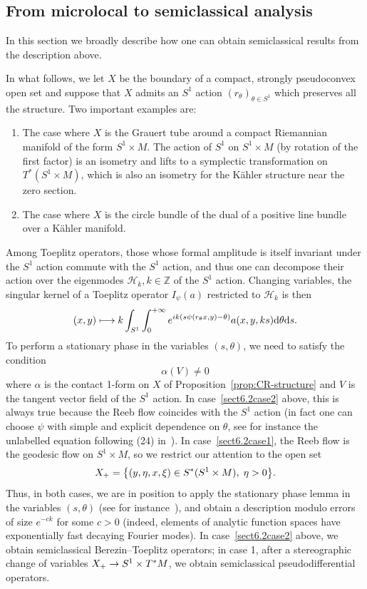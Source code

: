 \documentclass[AHL,Unicode,longabstracts,published]{cedram}
\newcommand{\clH}{\mathcal{H}}
\newcommand\1{\mathds{1}}
\newcommand{\Z}{\mathbb{Z}}
\newcommand{\dd}{\mathrm{d}}
\renewcommand*{\to}{\mathchoice{\longrightarrow}{\rightarrow}{\rightarrow}{\rightarrow}}
\let\oldmapsto\mapsto
\renewcommand*{\mapsto}{\mathchoice{\longmapsto}{\oldmapsto}{\oldmapsto}{\oldmapsto}}
\let\originalleft\left
\let\originalright\right
\renewcommand{\left}{\mathopen{}\mathclose\bgroup\originalleft}
\renewcommand{\right}{\aftergroup\egroup\originalright}
\begin{document}
\subsection{From microlocal to semiclassical analysis}\label{sec:from-micr-semicl}
In this section we broadly describe how one can obtain semiclassical results from the description above.

In what follows, we let $X$ be the boundary of a compact, strongly pseudoconvex open set and suppose that $X$ admits an $S^1$ action $(r_{\theta})_{\theta\in S^1}$ which preserves all the structure. Two important examples are:
\begin{enumerate}
\item\label{sect6.2case1} The case where $X$ is the Grauert tube around a compact Riemannian manifold of the form $S^1\times M$. The action of $S^1$ on $S^1\times M$ (by rotation of the first factor) is an isometry and lifts to a symplectic transformation on $T^*(S^1\times M)$, which is also an isometry for the K\"ahler structure near the zero section.
\item\label{sect6.2case2} The case where $X$ is the circle bundle of the dual of a positive line bundle over a K\"ahler manifold.
\end{enumerate}

Among Toeplitz operators, those whose formal amplitude is itself invariant under the $S^1$ action commute with the $S^1$ action, and thus one can decompose their action over the eigenmodes $\clH_k,k\in \Z$ of the $S^1$ action. Changing variables, the singular kernel of a Toeplitz operator $I_{\psi}(a)$ restricted to $\clH_k$ is then
\[
(x,y)\mapsto k\int_{S^1}\int_{0}^{+\infty}e^{ik(s\psi(r_{\theta}x,y)-\theta)}a(x,y,ks)\dd
\theta \dd s.
\]
To perform a stationary phase in the variables $(s,\theta)$, we need to satisfy the condition
\[
\alpha(V)\neq 0
\]
where $\alpha$ is the contact 1-form on $X$ of Proposition~\ref{prop:CR-structure} and $V$ is the tangent vector field of the $S^1$ action. In case~\eqref{sect6.2case2} above, this is always true because the Reeb flow coincides with the $S^1$ action (in fact one can choose $\psi$ with simple and explicit dependence on $\theta$, see for instance the unlabelled equation following (24) in~\cite{zelditch_pointwise_2018}). In case~\eqref{sect6.2case1}, the Reeb flow is the geodesic flow on $S^1\times M$, so we restrict our attention to the open set
\[
X_+=\left\{(y,\eta,x,\xi)\in S^*(S^1\times M),\; \eta>0\right\}.
\]
Thus, in both cases, we are in position to apply the stationary phase lemma in the variables $(s,\theta)$ (see for instance~\cite{zelditch_szego_2000}), and obtain a description modulo errors of size $e^{-ck}$ for some $c>0$ (indeed, elements of analytic function spaces have exponentially fast decaying Fourier modes). In case~\eqref{sect6.2case2} above, we obtain semiclassical Berezin--Toeplitz operators; in case 1, after a stereographic change of variables $X_+\to S^1\times T^*M$, we obtain semiclassical pseudodifferential operators.
\end{document}
